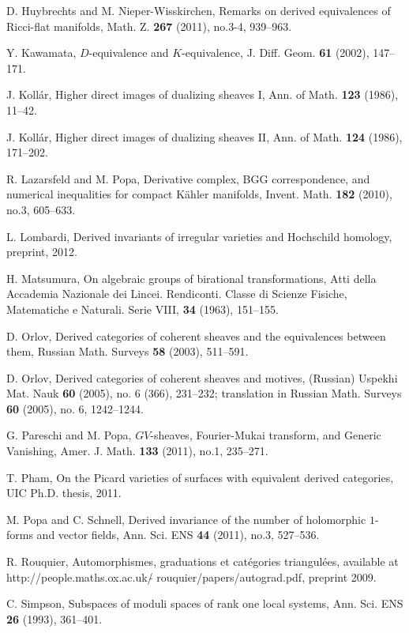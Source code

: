 \documentclass{amsart}
\theoremstyle{plain}
\theoremstyle{definition}
\numberwithin{equation}{section}
\begin{document}
\begin{thebibliography}{EMS}
D. Huybrechts and M. Nieper-Wisskirchen, {Remarks on derived equivalences of Ricci-flat manifolds}, 
Math. Z. \textbf{267} (2011), no.3-4, 939--963.

Y. Kawamata, {$D$-equivalence and $K$-equivalence}, J. Diff. Geom. \textbf{61} (2002), 147--171.

J. Koll\'ar, {Higher direct images of dualizing sheaves I}, Ann. of Math.
\textbf{123} (1986), 11--42.

J. Koll\'ar, {Higher direct images of dualizing sheaves II}, Ann. of
Math. \textbf{124} (1986), 171--202.

R. Lazarsfeld and M. Popa, {Derivative complex, BGG correspondence, and numerical inequalities for 
compact K\"ahler manifolds}, Invent. Math. \textbf{182} (2010), no.3, 605--633.

L. Lombardi, {Derived invariants of irregular varieties and Hochschild homology}, preprint, 2012.

H.  Matsumura, {On algebraic groups of birational transformations},
Atti della Accademia Nazionale dei Lincei. Rendiconti. Classe di Scienze Fisiche, Matematiche e Naturali. Serie VIII, \textbf{34} (1963), 151--155.

D. Orlov, {Derived categories of coherent sheaves and the equivalences between them}, Russian Math. Surveys \textbf{58} (2003), 511--591.

D. Orlov, {Derived categories of coherent sheaves and motives}, (Russian) Uspekhi Mat. Nauk \textbf{60} (2005), no. 6 (366), 231--232; translation in Russian Math. Surveys \textbf{60} (2005), no. 6, 1242--1244.

G. Pareschi and M. Popa, {$GV$-sheaves, Fourier-Mukai transform, and Generic Vanishing}, 
Amer. J. Math. \textbf{133} (2011), no.1, 235--271.

T. Pham, {On the Picard varieties of surfaces with equivalent derived categories}, UIC Ph.D. thesis, 2011.

M. Popa and C. Schnell, {Derived invariance of the number of holomorphic $1$-forms and vector fields}, 
Ann. Sci. ENS \textbf{44} (2011), no.3, 527--536. 

R. Rouquier, {Automorphismes, graduations et cat\'egories triangul\'ees}, available at http://people.maths.ox.ac.uk/$\tilde{}$ rouquier/papers/autograd.pdf, preprint 2009.

C. Simpson, {Subspaces of moduli spaces of rank one local systems}, Ann. Sci. ENS \textbf{26} (1993), 361--401.

\end{thebibliography}
\end{document}
